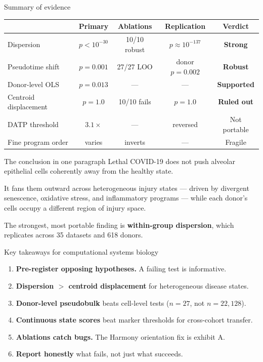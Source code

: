 \documentclass[aspectratio=169]{beamer}
\begin{document}
\begin{frame}{Summary of evidence}
\centering
\begin{tabular}{lcccc}
\toprule
& Primary & Ablations & Replication & Verdict \\
\midrule
Dispersion & $p < 10^{-30}$ & 10/10 robust & $p \approx 10^{-137}$ & \textbf{Strong} \\
Pseudotime shift & $p = 0.001$ & 27/27 LOO & donor $p = 0.002$ & \textbf{Robust} \\
Donor-level OLS & $p = 0.013$ & --- & --- & \textbf{Supported} \\
Centroid displacement & $p = 1.0$ & 10/10 fails & $p = 1.0$ & \textbf{Ruled out} \\
DATP threshold & $3.1\times$ & --- & reversed & \alert{Not portable} \\
Fine program order & varies & inverts & --- & \alert{Fragile} \\
\bottomrule
\end{tabular}
\end{frame}

\begin{frame}{The conclusion in one paragraph}
\large
Lethal COVID-19 does not push alveolar epithelial cells coherently away from the healthy state.

\vspace{0.5em}
It \alert{fans them outward} across heterogeneous injury states --- driven by divergent senescence, oxidative stress, and inflammatory programs --- while each donor's cells occupy a different region of injury space.

\vspace{0.5em}
The strongest, most portable finding is \textbf{within-group dispersion}, which replicates across 35 datasets and 618 donors.
\end{frame}

\begin{frame}{Key takeaways for computational systems biology}
\begin{enumerate}
  \item \textbf{Pre-register opposing hypotheses.} A failing test is informative.
  \item \textbf{Dispersion $>$ centroid displacement} for heterogeneous disease states.
  \item \textbf{Donor-level pseudobulk} beats cell-level tests ($n = 27$, not $n = 22{,}128$).
  \item \textbf{Continuous state scores} beat marker thresholds for cross-cohort transfer.
  \item \textbf{Ablations catch bugs.} The Harmony orientation fix is exhibit A.
  \item \textbf{Report honestly} what fails, not just what succeeds.
\end{enumerate}
\end{frame}
\end{document}
